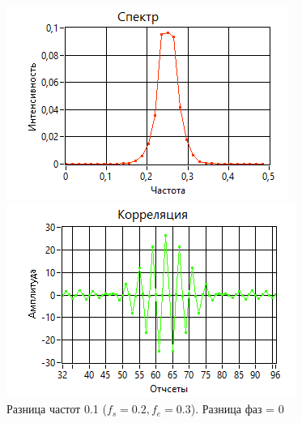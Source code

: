 \begin{figure}[h!]
    \centering
    \begin{minipage}{0.49\linewidth}
        \includegraphics[width =0.9\linewidth]{imgs/spec3.png}
    \end{minipage}
    \begin{minipage}{0.49\linewidth}
        \includegraphics[width =0.9\linewidth]{imgs/corr3.png}
    \end{minipage}
	\caption{Разница частот 0.1 ($f_{s}=0.2, f_{e}=0.3$). Разница фаз = 0}
	\label{fig:spec3}
\end{figure}

